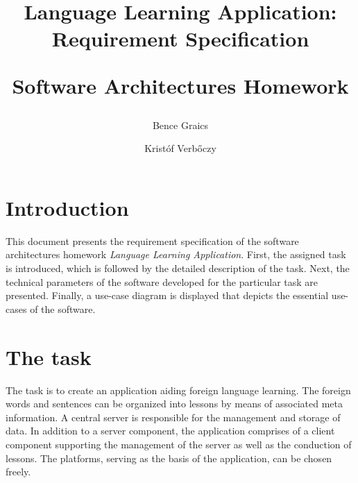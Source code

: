 \documentclass[a4paper]{article}
\begin{document}
	
	\newcommand{\specialcell}[2][c]{%
		\begin{tabular}[#1]{@{}c@{}}#2\end{tabular}}
	
	\newenvironment*{mytable}[3]{
		\begin{table}[htbp]	
			\caption{#1}          
			\label{tab:#2}            
			\center%
			\begin{tabular}{#3}
			}
			{
			\end{tabular}
		\end{table}
	}
	
	\pagestyle{plain}
	
	
	
	\nonfrenchspacing
	\setlength{\parindent}{0em}
	\setlength{\parskip}{0.45em}
	
	\title{Language Learning Application: \\ Requirement Specification \\ \begin{large}Software Architectures Homework \end{large}}
	\author{Bence Graics \and Kristóf Verbőczy}	
	\date{}
	\maketitle
	\section*{Introduction}
	This document presents the requirement specification of the software architectures homework \textsl{Language Learning Application}. First, the assigned task is introduced, which is followed by the detailed description of the task. Next, the technical parameters of the software developed for the particular task are presented. Finally, a use-case diagram is displayed that depicts the essential use-cases of the software.
	\section{The task}
	The task is to create an application aiding foreign language learning. The foreign words and sentences can be organized into lessons by means of associated meta information. A central server is responsible for the management and storage of data. In addition to a server component, the application comprises of a client component supporting the management of the server as well as the conduction of lessons. The platforms, serving as the basis of the application, can be chosen freely.
	
\end{document}
